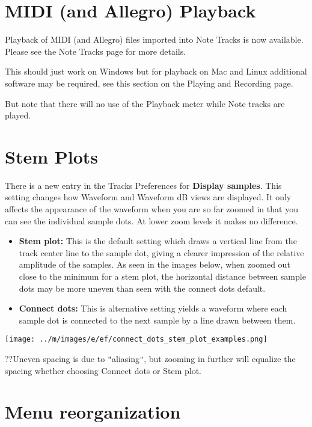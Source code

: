 \documentclass[twocolumn]{book}
\begin{document}

\section{MIDI (and Allegro) Playback}


Playback of MIDI (and Allegro) files imported into Note Tracks is now available.  Please see the Note Tracks page for more details.

This should just work on Windows but for playback on Mac and Linux additional software may be required, see this section on the Playing and Recording page.

But note that there will no use of the Playback meter while Note tracks are played. 



\section{Stem Plots}


There is a new entry in the Tracks Preferences for \textbf{Display samples}.  This setting changes how Waveform and Waveform dB views are displayed.  It only affects the appearance of the waveform when you are so far zoomed in that you can see the individual sample dots.  At lower zoom levels it makes no difference.  
\begin{itemize}
\item \textbf{Stem plot:} This is the default setting which draws a vertical line from the track center line to the sample dot, giving a clearer impression of the relative amplitude of the samples. As seen in the images below, when zoomed out close to the minimum for a stem plot, the horizontal distance between sample dots may be more uneven than seen with the connect dots default.   
\item \textbf{Connect dots:} This is alternative setting yields a waveform where each sample dot is connected to the next sample by a line drawn between them.  
\end{itemize}
\par\texttt{[image: ../m/images/e/ef/connect\_dots\_stem\_plot\_examples.png]}\par??Uneven spacing is due to \texttt{{}"{}}aliasing\texttt{{}"{}}, but zooming in further will equalize the spacing whether choosing Connect dots or Stem plot.



\section{Menu reorganization}
\end{document}
